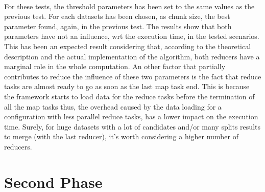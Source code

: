 \documentclass[]{report}
\begin{document}
    \\
   	For these tests, the threshold parameters has been set to the same values as the previous test. For each datasets has been chosen, as chunk size, the best parameter found, again, in the previous test. The results show that both parameters have not an influence, wrt the execution time,
	in the tested scenarios. This has been an expected result considering that, according to the theoretical description and the actual implementation of the algorithm, both reducers have a marginal role in the whole computation. An other factor that partially contributes to reduce the influence of these two parameters is the fact that reduce tasks are almost ready to go as soon as the last map task end. This is because the framework starts to load data for the reduce tasks before the termination of all the map tasks thus, the overhead caused by the data loading for a configuration with less parallel reduce tasks, has a lower impact on the execution time. Surely, for huge datasets with a lot of candidates and/or many splits results to merge (with the last reducer), it's worth considering a higher number of reducers.      	
   	
   	\section*{Second Phase}
   	
\end{document}

